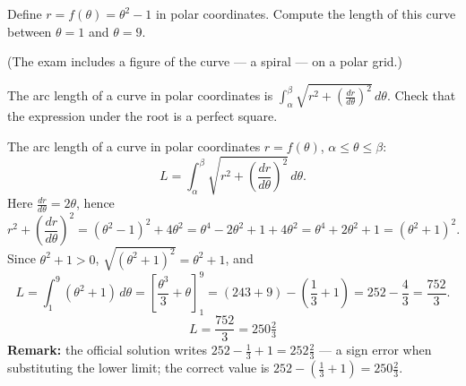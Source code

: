 
\begin{question}
Define $r=f(\theta)=\theta^2-1$ in polar coordinates. Compute the length of this curve between $\theta=1$ and $\theta=9$.

(The exam includes a figure of the curve — a spiral — on a polar grid.)
\end{question}

\begin{hint}
The arc length of a curve in polar coordinates is $\int_\alpha^\beta\sqrt{r^2+\left(\frac{dr}{d\theta}\right)^2}\,d\theta$. Check that the expression under the root is a perfect square.
\end{hint}

\begin{solution}
The arc length of a curve in polar coordinates $r=f(\theta)$, $\alpha\le\theta\le\beta$:
\[ L=\int_\alpha^\beta\sqrt{r^2+\left(\frac{dr}{d\theta}\right)^2}\,d\theta. \]
Here $\frac{dr}{d\theta}=2\theta$, hence
\[ r^2+\left(\frac{dr}{d\theta}\right)^2=(\theta^2-1)^2+4\theta^2=\theta^4-2\theta^2+1+4\theta^2=\theta^4+2\theta^2+1=(\theta^2+1)^2. \]
Since $\theta^2+1>0$, $\sqrt{(\theta^2+1)^2}=\theta^2+1$, and
\[ L=\int_1^9(\theta^2+1)\,d\theta=\left[\frac{\theta^3}{3}+\theta\right]_1^9=\left(243+9\right)-\left(\frac13+1\right)=252-\frac43=\frac{752}{3}. \]
\[ \boxed{L=\frac{752}{3}=250\tfrac23} \]
\textbf{Remark:} the official solution writes $252-\frac13+1=252\frac23$ — a sign error when substituting the lower limit; the correct value is $252-\left(\frac13+1\right)=250\frac23$.
\end{solution}
